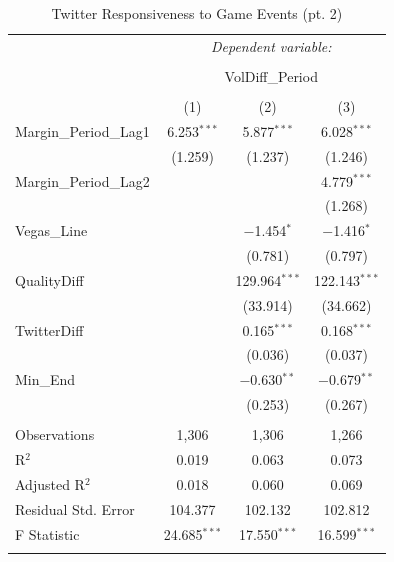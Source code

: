 \documentclass[12pt]{article}
\begin{document}
\begin{doublespacing}
\begin{table}[H] 
\centering 
\caption{Twitter Responsiveness to Game Events (pt. 2)} 
\label{table:volumeresponsiveness} 
\begin{tabular*}{\textwidth}{@{\extracolsep{\fill}}lccc} 
\hline 
\hline
 & \multicolumn{3}{c}{\textit{Dependent variable:}} \\ 
\cline{2-4} 
\\[-3.0ex] & \multicolumn{3}{c}{VolDiff\_Period} \\ 
\\[-1.5ex] & (1) & (2) & (3)\\ 
\hline
 Margin\_Period\_Lag1 & 6.253$^{***}$ & 5.877$^{***}$ & 6.028$^{***}$ \\ 
  & (1.259) & (1.237) & (1.246) \\ 
 Margin\_Period\_Lag2 &  &  & 4.779$^{***}$ \\ 
  &  &  & (1.268) \\ 
 Vegas\_Line &  & $-$1.454$^{*}$ & $-$1.416$^{*}$ \\ 
  &  & (0.781) & (0.797) \\ 
 QualityDiff &  & 129.964$^{***}$ & 122.143$^{***}$ \\ 
  &  & (33.914) & (34.662) \\ 
 TwitterDiff &  & 0.165$^{***}$ & 0.168$^{***}$ \\ 
  &  & (0.036) & (0.037) \\ 
 Min\_End &  & $-$0.630$^{**}$ & $-$0.679$^{**}$ \\ 
  &  & (0.253) & (0.267) \\ 
\hline \\[-1.8ex] 
Observations & 1,306 & 1,306 & 1,266 \\ 
R$^{2}$ & 0.019 & 0.063 & 0.073 \\ 
Adjusted R$^{2}$ & 0.018 & 0.060 & 0.069 \\ 
Residual Std. Error & 104.377 & 102.132 & 102.812 \\ 
F Statistic & 24.685$^{***}$  & 17.550$^{***}$ & 16.599$^{***}$ \\
\hline 
\hline \\[-1.8ex] 
\end{tabular*} 
\end{table} 


\end{doublespacing}
\end{document}

